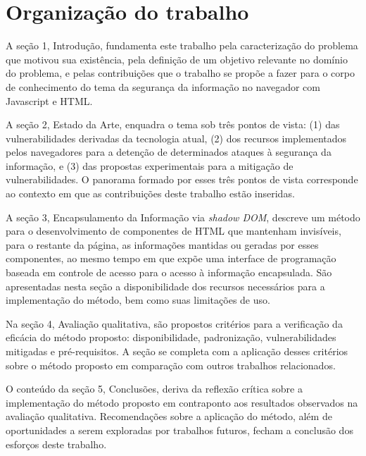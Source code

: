 \section{Organização do trabalho}

A seção 1, Introdução, fundamenta este trabalho pela caracterização do problema que motivou sua existência, pela definição de um objetivo relevante no domínio do problema, e pelas contribuições que o trabalho se propõe a fazer para o corpo de conhecimento do tema da segurança da informação no navegador com Javascript e HTML.

A seção 2, Estado da Arte, enquadra o tema sob três pontos de vista: (1) das vulnerabilidades derivadas da tecnologia atual, (2) dos recursos implementados pelos navegadores para a detenção de determinados ataques à segurança da informação, e (3) das propostas experimentais para a mitigação de vulnerabilidades. O panorama formado por esses três pontos de vista corresponde ao contexto em que as contribuições deste trabalho estão inseridas.

A seção 3, Encapsulamento da Informação via \textit{shadow DOM}, descreve um método para o desenvolvimento de componentes de HTML que mantenham invisíveis, para o restante da página, as informações mantidas ou geradas por esses componentes, ao mesmo tempo em que expõe uma interface de programação baseada em controle de acesso para o acesso à informação encapsulada. São apresentadas nesta seção a disponibilidade dos recursos necessários para a implementação do método, bem como suas limitações de uso.

Na seção 4, Avaliação qualitativa, são propostos critérios para a verificação da eficácia do método proposto: disponibilidade, padronização, vulnerabilidades mitigadas e pré-requisitos. A seção se completa com a aplicação desses critérios sobre o método proposto em comparação com outros trabalhos relacionados.

O conteúdo da seção 5, Conclusões, deriva da reflexão crítica sobre a implementação do método proposto em contraponto aos resultados observados na avaliação qualitativa. Recomendações sobre a aplicação do método, além de oportunidades a serem exploradas por trabalhos futuros, fecham a conclusão dos esforços deste trabalho.